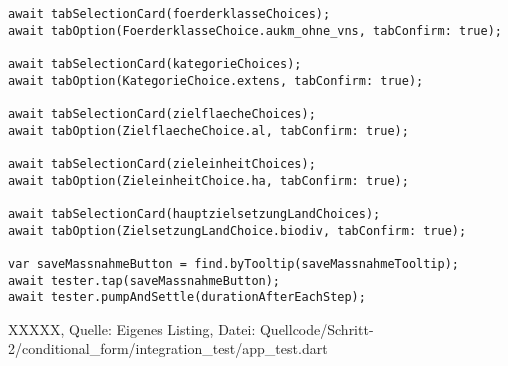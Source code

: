 \begin{listing}[htbp]
    \begin{verbatim}
await tabSelectionCard(foerderklasseChoices);
await tabOption(FoerderklasseChoice.aukm_ohne_vns, tabConfirm: true);

await tabSelectionCard(kategorieChoices);
await tabOption(KategorieChoice.extens, tabConfirm: true);

await tabSelectionCard(zielflaecheChoices);
await tabOption(ZielflaecheChoice.al, tabConfirm: true);

await tabSelectionCard(zieleinheitChoices);
await tabOption(ZieleinheitChoice.ha, tabConfirm: true);

await tabSelectionCard(hauptzielsetzungLandChoices);
await tabOption(ZielsetzungLandChoice.biodiv, tabConfirm: true);

var saveMassnahmeButton = find.byTooltip(saveMassnahmeTooltip);
await tester.tap(saveMassnahmeButton);
await tester.pumpAndSettle(durationAfterEachStep);
\end{verbatim}

\caption[Schritt 2 XXXXX]{XXXXX, Quelle: Eigenes Listing, \newline Datei: Quellcode/Schritt-2/conditional_form/integration_test/app_test.dart} 
  
 
\label{lst:Schritt2XXXXX}

\end{listing}

